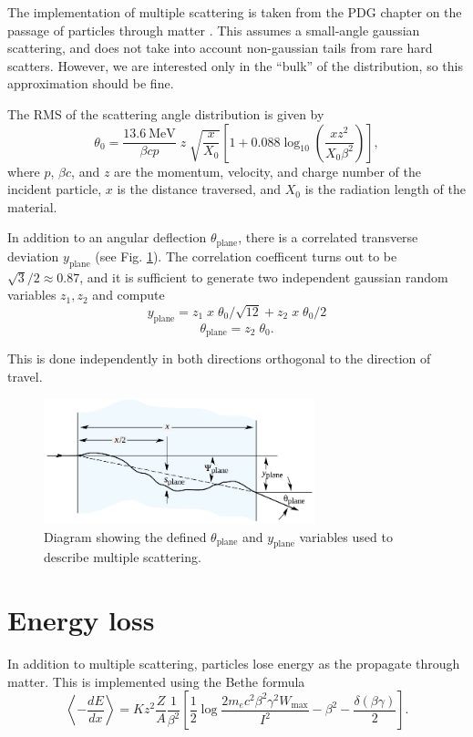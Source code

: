 \documentclass[12pt]{article}
\begin{document}
The implementation of multiple scattering is taken from the PDG chapter on the passage of particles through matter \cite{PDG_matter}.
This assumes a small-angle gaussian scattering, and does not take into account non-gaussian tails from rare hard scatters. However,
we are interested only in the ``bulk'' of the distribution, so this approximation should be fine.

The RMS of the scattering angle distribution is given by
\begin{equation}\label{eq:thrms}
\theta_0 = \frac{13.6~\text{MeV}}{\beta cp}\;z\;\sqrt{\frac{x}{X_0}}\left[1 + 0.088\log_{10}\left(\frac{xz^2}{X_0\beta^2}\right) \right],
\end{equation}
where $p$, $\beta c$, and $z$ are the momentum, velocity, and charge number of the incident particle, $x$ is the distance traversed, and 
$X_0$ is the radiation length of the material.

In addition to an angular deflection $\theta_\text{plane}$, there is a correlated transverse deviation $y_\text{plane}$ (see Fig. \ref{fig:mscangles}). The correlation coefficent
turns out to be $\sqrt{3}/2\approx0.87$, and it is sufficient to generate two independent gaussian random variables $z_1,z_2$ and compute
\begin{equation}\label{eq:msc}
y_\text{plane} = z_1\;x\;\theta_0/\sqrt{12} + z_2\;x\;\theta_0/2
\end{equation}
\[
\theta_\text{plane} = z_2\;\theta_0.
\]

This is done independently in both directions orthogonal to the direction of travel.

\begin{figure}
\centering
\includegraphics[width=0.7\textwidth]{plots/pdg_msc_diagram.png}
\caption{Diagram showing the defined $\theta_\text{plane}$ and $y_\text{plane}$ variables used to describe multiple scattering.}
\label{fig:mscangles}
\end{figure}

\section{Energy loss}
In addition to multiple scattering, particles lose energy as the propagate through matter. This is implemented using the 
Bethe formula
\begin{equation}\label{eq:dedx}
\left\langle-\frac{dE}{dx}\right\rangle = Kz^2\frac{Z}{A}\frac{1}{\beta^2}\left[\frac{1}{2}\log\frac{2m_ec^2\beta^2\gamma^2W_\text{max}}{I^2} - \beta^2 - \frac{\delta(\beta\gamma)}{2} \right].
\end{equation}
\end{document}
